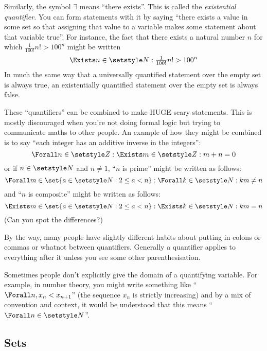 Similarly, the symbol \(\exists\) means ``there exists''. This is called the
\emph{existential quantifier}. You can form statements with it by saying ``there
exists a value in some set so that assigning that value to a variable makes some
statement about that variable true''. For instance, the fact that there exists a
natural number $n$ for which \(\frac 1{100!}n! > 100^n\) might be written
\begin{equation*}
 \Exists n \in \Naturals : \tfrac 1{100!}n! > 100^n
\end{equation*}
In much the same way that a universally quantified statement over the empty set
is always true, an existentially quantified statement over the empty set is
always false.

These ``quantifiers'' can be combined to make {\large HUGE} scary statements.
This is mostly discouraged when you're not doing formal logic but trying to
communicate maths to other people. An example of how they might be combined is
to say ``each integer has an additive inverse in the integers'':
\begin{equation*}
 \Forall n \in \Integers : \Exists m \in \Integers : m + n = 0
\end{equation*}
or if \(n \in \Naturals\) and \(n \ne 1\), ``\(n\) is prime'' might be written
as follows:
\begin{equation*}
 \Forall m \in \set{a \in \Naturals : 2 \le a < n} :
 \Forall k \in \Naturals :
 km \ne n
\end{equation*}
and ``\(n\) is composite'' might be written as follows:
\begin{equation*}
 \Exists m \in \set{a \in \Naturals : 2 \le a < n} :
 \Exists k \in \Naturals :
 km = n
\end{equation*}
(Can you spot the differences?)

By the way, many people have slightly different habits about putting in colons
or commas or whatnot between quantifiers. Generally a quantifier applies to
everything after it unless you see some other parenthesisation.

Sometimes people don't explicitly give the domain of a quantifying variable. For
example, in number theory, you might write something like
``\(\Forall n, x_n < x_{n + 1}\)'' (the sequence \(x_n\) is strictly increasing)
and by a mix of convention and context, it would be understood that this means
``\(\Forall n \in \Naturals\)''.

\subsection{Sets}

